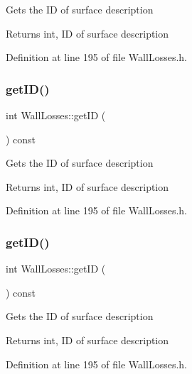 Gets the ID of surface description \begin{DoxyReturn}{Returns}
int, ID of surface description 
\end{DoxyReturn}


Definition at line 195 of file Wall\+Losses.\+h.

\mbox{\label{class_wall_losses_ae764fa8917879d8c24df7582c159fec6}} 
\subsubsection{\texorpdfstring{get\+I\+D()}{getID()}\hspace{0.1cm}{\footnotesize\ttfamily [2/3]}}
{\footnotesize\ttfamily int Wall\+Losses\+::get\+ID (\begin{DoxyParamCaption}{ }\end{DoxyParamCaption}) const\hspace{0.3cm}{\ttfamily [inline]}}

Gets the ID of surface description \begin{DoxyReturn}{Returns}
int, ID of surface description 
\end{DoxyReturn}


Definition at line 195 of file Wall\+Losses.\+h.

\mbox{\label{class_wall_losses_ae764fa8917879d8c24df7582c159fec6}} 
\subsubsection{\texorpdfstring{get\+I\+D()}{getID()}\hspace{0.1cm}{\footnotesize\ttfamily [3/3]}}
{\footnotesize\ttfamily int Wall\+Losses\+::get\+ID (\begin{DoxyParamCaption}{ }\end{DoxyParamCaption}) const\hspace{0.3cm}{\ttfamily [inline]}}

Gets the ID of surface description \begin{DoxyReturn}{Returns}
int, ID of surface description 
\end{DoxyReturn}


Definition at line 195 of file Wall\+Losses.\+h.


